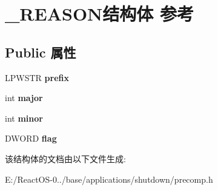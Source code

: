 \hypertarget{struct___r_e_a_s_o_n}{}\section{\+\_\+\+R\+E\+A\+S\+O\+N结构体 参考}
\label{struct___r_e_a_s_o_n}
\subsection*{Public 属性}
\begin{DoxyCompactItemize}
\item 
\mbox{\label{struct___r_e_a_s_o_n_a6e4e30f54a687c3eeab1edbcf4a76bc1}} 
L\+P\+W\+S\+TR {\bfseries prefix}
\item 
\mbox{\label{struct___r_e_a_s_o_n_a19b07e2eca5c81572954888a0f14c4a1}} 
int {\bfseries major}
\item 
\mbox{\label{struct___r_e_a_s_o_n_ad8ff820ee285bfc2ff482794ca21b3bf}} 
int {\bfseries minor}
\item 
\mbox{\label{struct___r_e_a_s_o_n_a35b023cde9dc5fa6a497188861a9ac0b}} 
D\+W\+O\+RD {\bfseries flag}
\end{DoxyCompactItemize}


该结构体的文档由以下文件生成\+:\begin{DoxyCompactItemize}
\item 
E\+:/\+React\+O\+S-\/0../base/applications/shutdown/precomp.\+h\end{DoxyCompactItemize}

